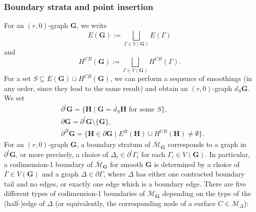 \documentclass[11pt]{amsart}
\theoremstyle{definition}
\theoremstyle{remark}
\newcommand{\<}{\left<}
\renewcommand{\>}{\right>}
\numberwithin{equation}{section}
\def\Mbar{{\overline{\mathcal M}}}
\begin{document}
\subsubsection{Boundary strata and point insertion}
For an $(r,0)$-graph $\bm{G}$, 
we write
$$
E(\bm{G}):=\bigsqcup_{\Gamma\in V(\bm{G})} E(\Gamma)
$$
and 
$$
H^{CB}(\bm{G}):= \bigsqcup_{\Gamma\in V(\bm{G})}  H^{CB}(\Gamma).
$$
For a set 
$S\subseteq E(\bm{G})\sqcup H^{CB}(\bm{G})$, 
we can perform a sequence of smoothings (in any order, since they lead to the same result) and obtain an $(r,0)$-graph $d_S \bm{G}$.  We set
\begin{align*}
&\partial^!\bm{G} = \{\bm{H} \; | \; \bm{G} = d_S\bm{H} \text{ for some } S\},\\
&\partial \bm{G} = \partial^!\bm{G} \setminus \{\bm{G}\},\\
&\partial^B \bm{G} = \{\bm{H} \in \partial \bm{G} \; | \; E^B(\bm{H}) \cup H^{CB}(\bm{H}) \neq \emptyset\}.
\end{align*}
For an $(r,0)$-graph $\mathbf{G}$, a boundary stratum of $\Mbar_\mathbf{G}$ corresponds to a graph in $\partial^!\mathbf{G}$, or more precisely, a choice of $\Delta_i\in \partial^! \Gamma_{i}$ for each $\Gamma_i\in V(\mathbf{G})$. In particular, a codimension-1 boundary of $\Mbar_\mathbf{G}$ for smooth $\mathbf{G}$ is determined by a choice of $\Gamma\in V(\mathbf{G})$ and a graph $\Delta \in \partial \Gamma$, where $\Delta$ has either one contracted boundary tail and no edges, or exactly one edge which is a boundary edge. There are five different types of codimension-1 boundaries of $\Mbar_\mathbf{G}$ depending on the type of the (half-)edge of $\Delta$ (or equivalently, the corresponding node of a surface $C\in \mathcal M_\Delta$): 
\end{document}
